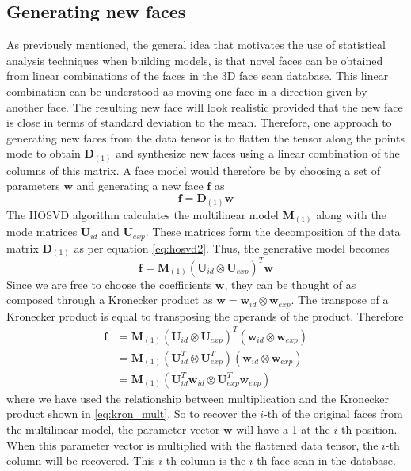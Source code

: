 \documentclass[11pt,a4paper]{report}
\begin{document}
\subsection{Generating new faces}
As previously mentioned, the general idea that motivates the use of statistical
analysis techniques when building models, is that
novel faces can be obtained from linear combinations of the faces in the 3D
face scan database. This linear combination can be understood as moving one
face in a direction given by another face. The resulting new face will look realistic provided that the new face is close in terms of standard
deviation to the mean. Therefore, one approach to generating new faces from the
data tensor is to flatten the tensor along the points mode to obtain
$\mathbf{D}_{(1)}$ and synthesize new faces using a linear combination of the
columns of this matrix. A face model would therefore be by choosing a set of
parameters $\mathbf{w}$ and generating a new face $\mathbf{f}$ as 
\begin{equation}\label{eq:gen}
\mathbf{f} = \mathbf{D}_{(1)}\mathbf{w}
\end{equation}
The HOSVD algorithm calculates the multilinear model $\mathbf{M}_{(1)}$ along with the mode
matrices $\mathbf{U}_{id}$ and $\mathbf{U}_{exp}$. These matrices form the
decomposition of the data matrix $\mathbf{D}_{(1)}$ as per equation
\ref{eq:hosvd2}. Thus, the generative model becomes
\begin{equation}\label{eq:gen0.1}
\mathbf{f} = \mathbf{M}_{(1)}(\mathbf{U}_{id} \otimes \mathbf{U}_{exp})^T\mathbf{w}
\end{equation}
Since we are free to choose the coefficients $\mathbf{w}$, they can be
thought of as composed through a Kronecker product as $\mathbf{w} =
\mathbf{w}_{id} \otimes \mathbf{w}_{exp}$. The transpose of a Kronecker product
is equal to transposing the operands of the product. Therefore
\begin{align}\label{eq:gen1}
\mathbf{f} &= \mathbf{M}_{(1)}(\mathbf{U}_{id} \otimes
\mathbf{U}_{exp})^T(\mathbf{w}_{id} \otimes \mathbf{w}_{exp})\\
&=\mathbf{M}_{(1)}(\mathbf{U}_{id}^T \otimes
\mathbf{U}_{exp}^T)(\mathbf{w}_{id} \otimes \mathbf{w}_{exp})\\
\label{eq:gen2}
&= \mathbf{M}_{(1)}(\mathbf{U}_{id}^T\mathbf{w}_{id} \otimes
\mathbf{U}_{exp}^T\mathbf{w}_{exp})
\end{align}
where we have used the relationship between multiplication and the Kronecker
product shown in \ref{eq:kron_mult}. So to recover the $i$-th of the original faces
from the multilinear model, the parameter vector $\mathbf{w}$ will have a 1 at
the $i$-th position. When this parameter vector is multiplied with the flattened
data tensor, the $i$-th column will be recovered. This $i$-th column is the
$i$-th face scan in the database. 
\end{document}
